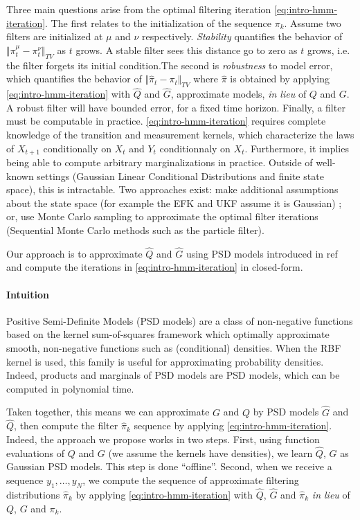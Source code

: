 Three main questions arise from the optimal filtering iteration \cref{eq:intro-hmm-iteration}. The first relates to the initialization of the sequence $\pi_k$. Assume two filters are initialized at $\mu$ and $\nu$ respectively. \emph{Stability} quantifies the behavior of $\Vert \pi_t^\mu - \pi_t^\nu \Vert_{TV}$ as $t$ grows. A stable filter sees this distance go to zero as $t$ grows, i.e. the filter forgets its initial condition.The second is \emph{robustness} to model error, which quantifies the behavior of $\Vert \hat\pi_t - \pi_t\Vert_{TV}$ where $\hat \pi$ is obtained by applying \cref{eq:intro-hmm-iteration} with $\hat Q$ and $\hat G$, approximate models, \emph{in lieu} of $Q$ and $G$. A robust filter will have bounded error, for a fixed time horizon. Finally, a filter must be computable in practice. \cref{eq:intro-hmm-iteration} requires complete knowledge of the transition and measurement kernels, which characterize the laws of $X_{t+1}$ conditionally on $X_t$ and $Y_t$ conditionnaly on $X_t$. Furthermore, it implies being able to compute arbitrary marginalizations in practice. Outside of well-known settings (Gaussian Linear Conditional Distributions and finite state space), this is intractable. Two approaches exist: make additional assumptions about the state space (for example the EFK and UKF assume it is Gaussian) ; or, use Monte Carlo sampling to approximate the optimal filter iterations (Sequential Monte Carlo methods such as the particle filter).

Our approach is to approximate $\hat Q$ and $\hat G$ using PSD models introduced in ref and compute the iterations in \cref{eq:intro-hmm-iteration} in closed-form.

\paragraph{Intuition}
Positive Semi-Definite Models (PSD models) are a class of non-negative functions based on the kernel sum-of-squares framework which optimally approximate smooth, non-negative functions such as (conditional) densities. When the RBF kernel is used, this family is useful for approximating probability densities. Indeed, products and marginals of PSD models are PSD models, which can be computed in polynomial time.

Taken together, this means we can approximate $G$ and $Q$ by PSD models $\hat G$ and $\hat Q$, then compute the filter $\hat \pi_k$ sequence by applying \cref{eq:intro-hmm-iteration}. Indeed, the approach we propose works in two steps. First, using function evaluations of $Q$ and $G$ (we assume the kernels have densities), we learn $\hat Q$, $\hat G$ as Gaussian PSD models. This step is done ``offline''. Second, when we receive a sequence $y_1, \ldots, y_N$, we compute the sequence of approximate filtering distributions $\hat\pi_k$ by applying \cref{eq:intro-hmm-iteration} with $\hat Q$, $\hat G$ and $\hat \pi_k$ \emph{in lieu} of $Q$, $G$ and $\pi_k$.


